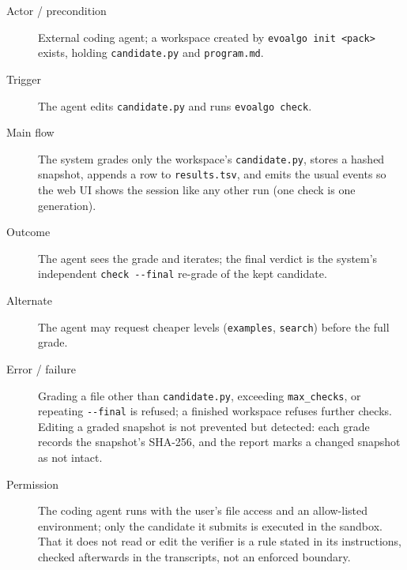\begin{description}
  \item[Actor / precondition] External coding agent; a workspace created by
  \texttt{evoalgo init <pack>} exists, holding \texttt{candidate.py} and
  \texttt{program.md}.
  \item[Trigger] The agent edits \texttt{candidate.py} and runs
  \texttt{evoalgo check}.
  \item[Main flow] The system grades only the workspace's
  \texttt{candidate.py}, stores a hashed snapshot, appends a row to
  \texttt{results.tsv}, and emits the usual events so the web UI shows the
  session like any other run (one check is one generation).
  \item[Outcome] The agent sees the grade and iterates; the final verdict is the
  system's independent \texttt{check -{}-final} re-grade of the kept candidate.
  \item[Alternate] The agent may request cheaper levels (\texttt{examples},
  \texttt{search}) before the full grade.
  \item[Error / failure] Grading a file other than \texttt{candidate.py},
  exceeding \texttt{max\_checks}, or repeating \texttt{-{}-final} is refused; a
  finished workspace refuses further checks. Editing a graded snapshot is not
  prevented but detected: each grade records the snapshot's SHA-256, and the
  report marks a changed snapshot as not intact.
  \item[Permission] The coding agent runs with the user's file access and an
  allow-listed environment; only the candidate it submits is executed in the
  sandbox. That it does not read or edit the verifier is a rule stated in its
  instructions, checked afterwards in the transcripts, not an enforced boundary.
\end{description}

